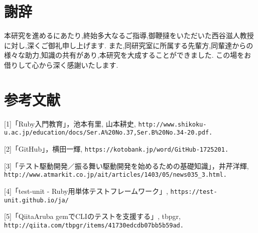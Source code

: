 \section{謝辞}
本研究を進めるにあたり,終始多大なるご指導,御鞭撻をいただいた西谷滋人教授に対し,深くご御礼申し上げます.
また,同研究室に所属する先輩方,同輩達からの様々な助力,知識の共有があり,本研究を大成することができました.
この場をお借りして心から深く感謝いたします.

\section{参考文献}
[1]「Ruby入門教育」，池本有里, 山本耕史, \verb|http://www.shikoku-u.ac.jp/education/docs/Ser.A%20No.37,Ser.B%20No.34-20.pdf.|

[2]「GitHub」，横田一輝, \verb|https://kotobank.jp/word/GitHub-1725201.|

[3]「テスト駆動開発／振る舞い駆動開発を始めるための基礎知識」，井芹洋輝, \verb|http://www.atmarkit.co.jp/ait/articles/1403/05/news035_3.html.|

[4]「test-unit - Ruby用単体テストフレームワーク」, \verb|https://test-unit.github.io/ja/|

[5]「QiitaAruba gemでCLIのテストを支援する」, tbpgr, \verb|http://qiita.com/tbpgr/items/41730edcdb07bb5b59ad.|

